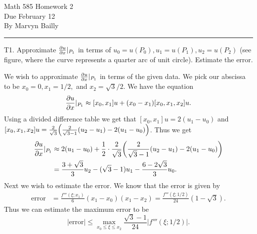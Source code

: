 \documentclass[12pt]{report}
\begin{document}
\large

\begin{center}
 Math 585 Homework 2\\
 Due February 12\\
 By Marvyn Bailly\\
\end{center}

\normalsize

\hrule



\begin{problem}
   T1. Approximate $\frac{\partial u}{\partial x}|_{P_1}$ in terms of $u_0 = u(P_0), u_1 = u(P_1), u_2= u(P_2)$ (see figure, where the curve represents a quarter arc of unit circle). Estimate the error.
\end{problem}

\begin{solution}

    \noindent
    We wish to approximate $\frac{\partial u}{\partial x}|_{P_1}$ in terms of the given data. We pick our abscissa to be $x_0 = 0, x_1 = 1/2,$ and $x_2 = \sqrt{3}/2.$ We have the equation
    \[ 
        \frac{\partial u}{\partial x}|_{P_1} \approx [x_0, x_1]u + (x_0 - x_1)[x_0,x_1,x_2]u.
    \]  
    Using a divided difference table we get that $[x_0, x_1]u = 2(u_1 - u_0)$ and $[x_0,x_1,x_2]u = \frac{2}{\sqrt{3}}{\left(\frac{2}{\sqrt{3}-1}{\left(u_2 - u_1\right)}-2(u_1 - u_0)\right)}$. Thus we get
    \begin{align*}
        \frac{\partial u}{\partial x}|_{P_1} &\approx 2(u_1 - u_0) + \frac{1}{2}\cdot\frac{2}{\sqrt{3}}{\left(\frac{2}{\sqrt{3}-1}{\left(u_2 - u_1\right)}-2(u_1 - u_0)\right)}\\
        &= \frac{3 + \sqrt{3}}{3}u_2 -(\sqrt{3}-1)u_1 - \frac{6-2\sqrt{3}}{3}u_0.
    \end{align*} 
    Next we wish to estimate the error. We know that the error is given by
    \begin{align*}
        \text{error} &= \frac{f'''(\xi;x_1)}{6}(x_1 - x_0)(x_1 - x_2) = \frac{f'''(\xi;1/2)}{24}(1 - \sqrt{3}).
    \end{align*}
    Thus we can estimate the maximum error to be
    \[ 
        |\text{error}|\leq \max_{x_0 \leq \xi \leq x_2} \frac{\sqrt{3}-1}{24}\left|f'''(\xi;1/2)\right|.
    \]

\end{solution}

\newpage
\end{document}
